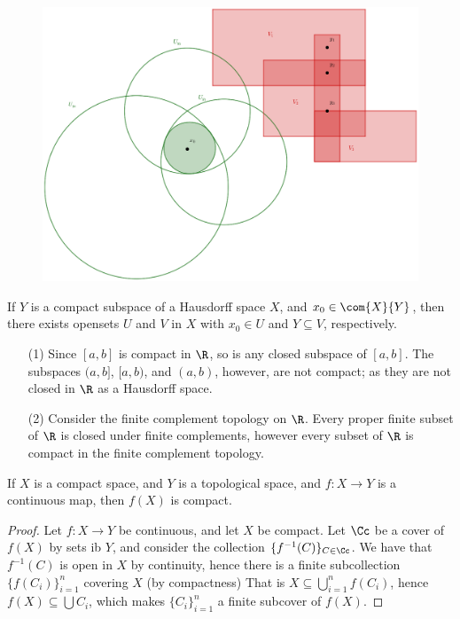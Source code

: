 \begin{figure}[h]
    \centering
    \includegraphics[scale=0.2]{Figures/Chapter3/compactHausdorff1.eps}
    \caption{}
    \label{fig_3.1}
\end{figure}

\begin{corollary}
    If $Y$ is a compact subspace of a Hausdorff space $X$, and  $ x_0 \in \com{X}{Y}$, then there
    exists opensets $U$ and  $V$ in  $X$ with  $ x_0 \in U$ and $Y \subseteq V$, respectively.
\end{corollary}

\begin{example}
    \begin{enumerate}
        \item[(1)] Since $[a,b]$ is compact in $\R$, so is any closed subspace of  $[a,b]$. The
            subspaces $(a,b]$, $[a,b)$, and $(a,b)$, however, are not compact; as they are not
            closed in $\R$ as a Hausdorff space.

        \item [(2)] Consider the finite complement topology on $\R$. Every proper finite subset of
            $\R$ is closed under finite complements, however every subset of  $\R$ is compact in the
            finite complement topology.
    \end{enumerate}
\end{example}

\begin{theorem}\label{3.4.4}
    If $X$ is a compact space, and  $Y$ is a topological space, and  $f:X \rightarrow Y$ is a
    continuous map, then $f(X)$ is compact.
\end{theorem}
\begin{proof}
    Let $f:X \rightarrow Y$ be continuous, and let $X$ be compact. Let  $\Cc$ be a cover of  $f(X)$
    by sets ib $Y$, and consider the collection  $\{f^{-1}(C)\}_{C \in \Cc}$. We have that
    $f^{-1}(C)$ is open in $X$ by continuity, hence there is a finite subcollection
    $\{f(C_i)\}_{i=1}^n$ covering $X$  (by compactness) That is $X \subseteq
    \bigcup_{i=1}^n{f(C_i)}$, hence $f(X) \subseteq \bigcup{C_i}$, which makes $\{C_i\}_{i=1}^n$ a
    finite subcover of $f(X)$.
\end{proof}

